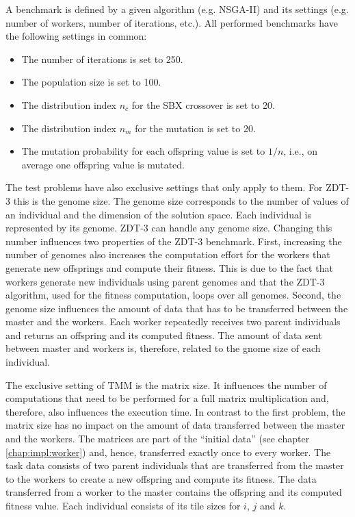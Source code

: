 A benchmark is defined by a given algorithm (e.g. NSGA-II) and its settings (e.g. number of workers, number of iterations, etc.). All performed benchmarks have the following settings in common:
\begin{itemize}
  \item The number of iterations is set to 250.
  \item The population size is set to 100.
  \item The distribution index $n_c$ for the SBX crossover is set to 20.
  \item The distribution index $n_m$ for the mutation is set to 20.
  \item The mutation probability for each offspring value is set to $1/n$, i.e., on average one offspring value is mutated.
\end{itemize}

The test problems have also exclusive settings that only apply to them. For ZDT-3 this is the genome size. The genome size corresponds to the number of values of an individual and the dimension of the solution space. Each individual is represented by its genome. ZDT-3 can handle any genome size. Changing this number influences two properties of the ZDT-3 benchmark. First, increasing the number of genomes also increases the computation effort for the workers that generate new offsprings and compute their fitness. This is due to the fact that workers generate new individuals using parent genomes and that the ZDT-3 algorithm, used for the fitness computation, loops over all genomes. Second, the genome size influences the amount of data that has to be transferred between the master and the workers. Each worker repeatedly receives two parent individuals and returns an offspring and its computed fitness. The amount of data sent between master and workers is, therefore, related to the gnome size of each individual.

The exclusive setting of TMM is the matrix size. It influences the number of computations that need to be performed for a full matrix multiplication and, therefore, also influences the execution time. In contrast to the first problem, the matrix size has no impact on the amount of data transferred between the master and the workers. The matrices are part of the ``initial data'' (see chapter \ref{chap:impl:worker}) and, hence, transferred exactly once to every worker. The task data consists of two parent individuals that are transferred from the master to the workers to create a new offspring and compute its fitness. The data transferred from a worker to the master contains the offspring and its computed fitness value. Each individual consists of its tile sizes for $i$, $j$ and $k$.

